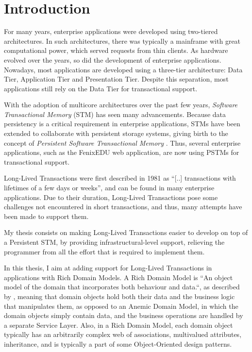 \chapter{Introduction}

For many years, enterprise applications were developed using
two-tiered architectures. In such architectures, there was typically a
mainframe with great computational power, which served requests from
thin clients. As hardware evolved over the years, so did the
development of enterprise applications. Nowadays, most applications
are developed using a three-tier architecture: Data Tier, Application
Tier and Presentation Tier. Despite this separation, most applications
still rely on the Data Tier for transactional support.

With the adoption of multicore architectures over the past few years,
{\it Software Transactional Memory} (STM) has seen many advancements.
Because data persistency is a critical requirement in enterprise
applications, STMs have been extended to collaborate with persistent
storage systems, giving birth to the concept of {\it Persistent
  Software Transactional Memory} \cite{fernandes2011strict}. Thus,
several enterprise applications, such as the FenixEDU web application,
are now using PSTMs for transactional support.

Long-Lived Transactions were first described in 1981 as ``[..]
transactions with lifetimes of a few days or
weeks''\cite{gray1981transaction}, and can be found in many enterprise
applications. Due to their duration, Long-Lived Transactions pose some
challenges not encountered in short transactions, and thus, many
attempts have been made to support them.

My thesis consists on making Long-Lived Transactions easier to develop
on top of a Persistent STM, by providing infrastructural-level
support, relieving the programmer from all the effort that is required
to implement them.

In this thesis, I aim at adding support for Long-Lived Transactions in
applications with Rich Domain Models.  A Rich Domain Model is ``An
object model of the domain that incorporates both behaviour and
data.``, as described by \cite{fowler2003patterns}, meaning that
domain objects hold both their data and the business logic that
manipulates them, as opposed to an Anemic Domain Model, in which the
domain objects simply contain data, and the business operations are
handled by a separate Service Layer. Also, in a Rich Domain Model,
each domain object typically has an arbitrarily complex web of
associations, multivalued attributes, inheritance, and is typically a
part of some Object-Oriented design patterns.

